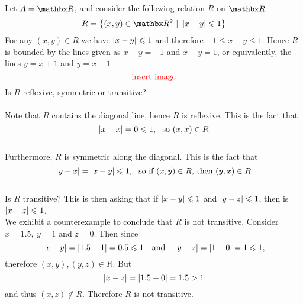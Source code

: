 \vspace*{1em}

\begin{example}
Let $A = \rr$, and consider the following relation $R$ on $\rr$
\[R = \setp{(x,y) \in \rr^2}{\abs{x-y} \leq 1}\]
For any $(x,y) \in R$ we have $\left\lvert x - y\right\rvert \leqslant 1$ and therefore $-1 \leq x - y \leq 1$. Hence $R$ is bounded by the lines given as $x - y = -1$ and $x - y = 1$, or equivalently, the lines $y = x + 1$ and $y = x-1$
\[\text{\color{red}insert image}\]
Is $R$  reflexive, symmetric  or transitive?\\
\\
Note that $R$ contains the diagonal line, hence $R$ is reflexive. This is the fact that 
\[\left\lvert x - x\right\rvert = 0 \leqslant 1,\ \text{ so } (x,x) \in R\]\\
Furthermore, $R$ is symmetric along the diagonal. This is the fact that
\[\left\lvert y - x\right\rvert = \left\lvert x - y\right\rvert \leqslant 1,\ \text{ so if $(x,y) \in R$, then $(y,x) \in R$}\]\\
Is $R$ transitive? This is then asking that if $\left\lvert x - y\right\rvert \leqslant 1$ and $\left\lvert y - z\right\rvert \leqslant 1$, then is $\left\lvert x - z\right\rvert \leqslant 1$.\\[0.5em]
We exhibit a counterexample to conclude that $R$ is not transitive. Consider $x = 1.5,\ y = 1$ and $z = 0$. Then since
\[\left\lvert x - y\right\rvert = \left\lvert1.5 - 1\right\rvert = 0.5 \leqslant 1 \quad \text{and} \quad \left\lvert y - z\right\rvert = \left\lvert1 - 0\right\rvert = 1 \leqslant 1,\]
therefore $(x,y),(y,z) \in R$. But \[\left\lvert x - z\right\rvert = \left\lvert1.5 - 0\right\rvert = 1.5 > 1\] and thus $(x,z) \notin R$. Therefore $R$ is not transitive.
\end{example}